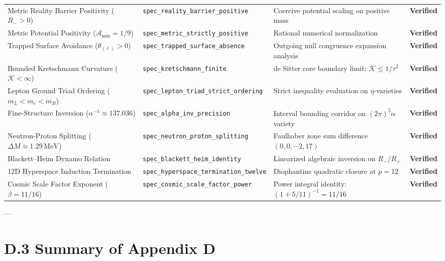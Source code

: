 \documentclass[
    12pt,
    a4paper,
    headings=normal,
    twoside=false,
    open=any,
    parskip=half
]{scrbook}
\begin{document}
\begin{table}[htbp]
\begin{adjustbox}{max width=\textwidth}
\begin{tabular}{p{4.2cm}p{4.2cm}p{4.2cm}c}
\rowcolor{secondarycolor!8}
Metric Reality Barrier Positivity ($R_- > 0$) & \texttt{spec\_reality\_barrier\_positive} & Coercive potential scaling on positive mass & \textbf{Verified} \\
Metric Potential Positivity ($\mathcal{A}_{\min} = 1/9$) & \texttt{spec\_metric\_strictly\_positive} & Rational numerical normalization & \textbf{Verified} \\
\rowcolor{secondarycolor!8}
Trapped Surface Avoidance ($\theta_{(\ell)} > 0$) & \texttt{spec\_trapped\_surface\_absence} & Outgoing null congruence expansion analysis & \textbf{Verified} \\
Bounded Kretschmann Curvature ($\mathcal{K} < \infty$) & \texttt{spec\_kretschmann\_finite} & de Sitter core boundary limit: $\mathcal{K} \le 1/\tau^2$ & \textbf{Verified} \\
\rowcolor{secondarycolor!8}
Lepton Ground Triad Ordering ($m_L < m_e < m_B$) & \texttt{spec\_lepton\_triad\_strict\_ordering} & Strict inequality evaluation on $\eta$-varieties & \textbf{Verified} \\
Fine-Structure Inversion ($\alpha^{-1} \approx 137.036$) & \texttt{spec\_alpha\_inv\_precision} & Interval bounding corridor on $(2\pi)^5\alpha$ variety & \textbf{Verified} \\
\rowcolor{secondarycolor!8}
Neutron-Proton Splitting ($\Delta M \approx 1.29\,\text{MeV}$) & \texttt{spec\_neutron\_proton\_splitting} & Faulhaber zone sum difference $(0,0,-2,17)$ & \textbf{Verified} \\
Blackett--Heim Dynamo Relation & \texttt{spec\_blackett\_heim\_identity} & Linearized algebraic inversion on $R_-/R_+$ & \textbf{Verified} \\
\rowcolor{secondarycolor!8}
12D Hyperspace Induction Termination & \texttt{spec\_hyperspace\_termination\_twelve} & Diophantine quadratic closure at $p = 12$ & \textbf{Verified} \\
Cosmic Scale Factor Exponent ($\beta = 11/16$) & \texttt{spec\_cosmic\_scale\_factor\_power} & Power integral identity: $(1 + 5/11)^{-1} = 11/16$ & \textbf{Verified} \\\bottomrule
\end{tabular}
\end{adjustbox}
\end{table}

---

\section{D.3 Summary of Appendix D}
\label{sec:appD_summary_signoff}
\end{document}
